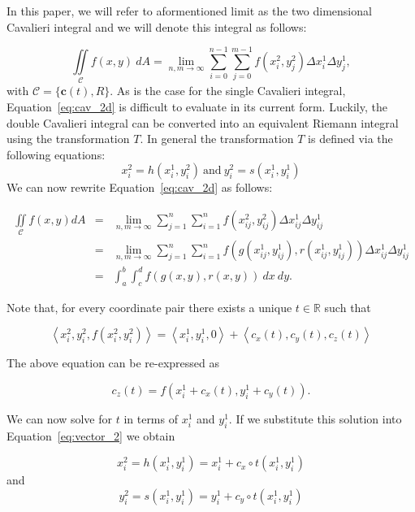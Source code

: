 \documentclass{article}
\theoremstyle{theorem}
\theoremstyle{definition}
\begin{document}
In this paper, we will refer to aformentioned limit as the two dimensional Cavalieri integral and we will denote this integral as follows:

\begin{equation}
\label{eq:cav_2d}
\iint \limits_{\mathcal{C}} f(x,y)~dA = \lim_{n,m \rightarrow \infty}  \sum_{i=0}^{n-1} \sum_{j=0}^{m-1} f(x_i^2,y_j^2) \Delta x_i^1 \Delta y_j^1,
\end{equation}
with $\mathcal{C} = \{\mathbf{c}(t),R\}$. As is the case for the single Cavalieri integral, Equation~\eqref{eq:cav_2d} is difficult to evaluate in its current form. Luckily, the double 
Cavalieri integral can be converted into an equivalent Riemann integral using the transformation $T$. In general the transformation $T$ is defined via the following 
equations:
\begin{equation}
x_i^2 = h(x_i^1,y_i^2)~\textrm{and}~y_i^2 = s(x_i^1,y_i^1) 
\end{equation}
We can now rewrite Equation~\eqref{eq:cav_2d} as follows:

\begin{eqnarray}
\iint\limits_{\!\mathcal{C}} f(x,y) dA &=& \lim_{n,m\rightarrow \infty} \sum_{j=1}^n\sum_{i=1}^n f(x_{ij}^2,y_{ij}^2) \Delta x_{ij}^1\Delta y_{ij}^1\\
&=&  \lim_{n,m\rightarrow \infty} \sum_{j=1}^n\sum_{i=1}^n f(g(x_{ij}^1,y_{ij}^1),r(x_{ij}^1,y_{ij}^1)) \Delta x_{ij}^1\Delta y_{ij}^1\\
&=& \int_a^b\int_c^d f(g(x,y),r(x,y))~dx~dy.
\end{eqnarray}

Note that, for every coordinate pair there exists a unique $t\in \mathbb{R}$ such that 

\begin{equation}
\label{eq:vector_2}
\left< x_i^2, y_i^2, f(x_i^2,y_i^2) \right > = \left < x_i^1, y_i^1, 0 \right > + \left <c_x(t),c_y(t),c_z(t)\right >  
\end{equation}

The above equation can be re-expressed as

\begin{equation}
c_z(t) = f(x_i^1 + c_x(t),y_i^1 + c_y(t)). 
\end{equation}

We can now solve for $t$ in terms of $x_i^1$ and $y_i^1$. If we substitute this solution into Equation~\ref{eq:vector_2} we obtain

\begin{equation}
x_i^2 = h(x_i^1,y_i^1) = x_i^1 + c_x\circ t(x_i^1,y_i^1) 
\end{equation}
and 
\begin{equation}
y_i^2 = s(x_i^1,y_i^1) = y_i^1 + c_y\circ t(x_i^1,y_i^1) 
\end{equation}
\end{document}
